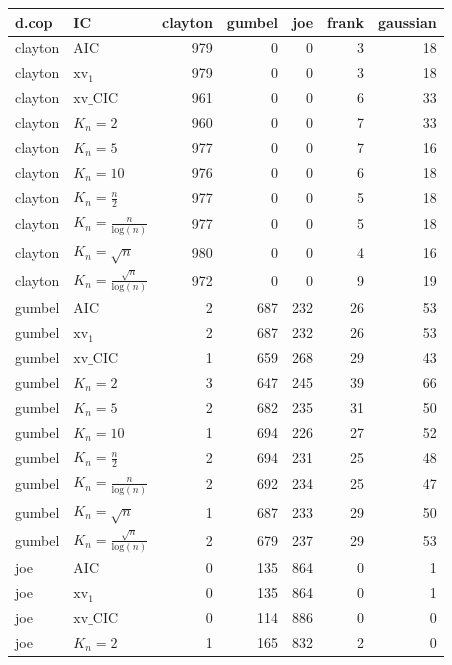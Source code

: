 \begin{table}[htbp]
\centering
\begin{tabular}{llrrrrr}
  \hline
d.cop & IC & clayton & gumbel & joe & frank & gaussian \\ 
  \hline
clayton & AIC & 979 & 0 & 0 & 3 & 18 \\ 
  clayton & $\text{xv}_{1}$ & 979 & 0 & 0 & 3 & 18 \\ 
  clayton & $\text{xv}\_\text{CIC}$ & 961 & 0 & 0 & 6 & 33 \\ 
  clayton & $K_{n}=2$ & 960 & 0 & 0 & 7 & 33 \\ 
  clayton & $K_{n}=5$ & 977 & 0 & 0 & 7 & 16 \\ 
  clayton & $K_{n}=10$ & 976 & 0 & 0 & 6 & 18 \\ 
  clayton & $K_{n}=\tfrac{n}{2}$ & 977 & 0 & 0 & 5 & 18 \\ 
  clayton & $K_{n}=\tfrac{n}{\text{log}(n)}$ & 977 & 0 & 0 & 5 & 18 \\ 
  clayton & $K_{n}=\sqrt{n}$ & 980 & 0 & 0 & 4 & 16 \\ 
  clayton & $K_{n}=\tfrac{\sqrt{n}}{\text{log}(n)}$ & 972 & 0 & 0 & 9 & 19 \\ 
   \hdashline
gumbel & AIC & 2 & 687 & 232 & 26 & 53 \\ 
  gumbel & $\text{xv}_{1}$ & 2 & 687 & 232 & 26 & 53 \\ 
  gumbel & $\text{xv}\_\text{CIC}$ & 1 & 659 & 268 & 29 & 43 \\ 
  gumbel & $K_{n}=2$ & 3 & 647 & 245 & 39 & 66 \\ 
  gumbel & $K_{n}=5$ & 2 & 682 & 235 & 31 & 50 \\ 
  gumbel & $K_{n}=10$ & 1 & 694 & 226 & 27 & 52 \\ 
  gumbel & $K_{n}=\tfrac{n}{2}$ & 2 & 694 & 231 & 25 & 48 \\ 
  gumbel & $K_{n}=\tfrac{n}{\text{log}(n)}$ & 2 & 692 & 234 & 25 & 47 \\ 
  gumbel & $K_{n}=\sqrt{n}$ & 1 & 687 & 233 & 29 & 50 \\ 
  gumbel & $K_{n}=\tfrac{\sqrt{n}}{\text{log}(n)}$ & 2 & 679 & 237 & 29 & 53 \\ 
   \hdashline
joe & AIC & 0 & 135 & 864 & 0 & 1 \\ 
  joe & $\text{xv}_{1}$ & 0 & 135 & 864 & 0 & 1 \\ 
  joe & $\text{xv}\_\text{CIC}$ & 0 & 114 & 886 & 0 & 0 \\ 
  joe & $K_{n}=2$ & 1 & 165 & 832 & 2 & 0 \\ 

\end{tabular}
\end{table}
